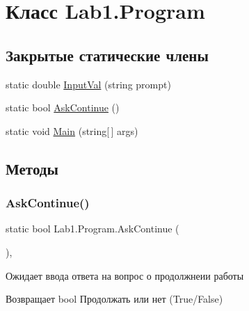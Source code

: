 \hypertarget{class_lab1_1_1_program}{}\section{Класс Lab1.\+Program}
\label{class_lab1_1_1_program}
\subsection*{Закрытые статические члены}
\begin{DoxyCompactItemize}
\item 
static double \hyperlink{class_lab1_1_1_program_a569623f6b568a6770c7d2a6b8726a7f7}{Input\+Val} (string prompt)
\item 
static bool \hyperlink{class_lab1_1_1_program_ab7d87ed9c7f3b503a0bf3a3654c706c6}{Ask\+Continue} ()
\item 
static void \hyperlink{class_lab1_1_1_program_ad4e0610aa096a9b9ab69f7fc7425799f}{Main} (string\mbox{[}$\,$\mbox{]} args)
\end{DoxyCompactItemize}


\subsection{Методы}
\mbox{\label{class_lab1_1_1_program_ab7d87ed9c7f3b503a0bf3a3654c706c6}} 
\subsubsection{\texorpdfstring{Ask\+Continue()}{AskContinue()}}
{\footnotesize\ttfamily static bool Lab1.\+Program.\+Ask\+Continue (\begin{DoxyParamCaption}{ }\end{DoxyParamCaption})\hspace{0.3cm}{\ttfamily [static]}, {\ttfamily [private]}}

Ожидает ввода ответа на вопрос о продолжнеии работы \begin{DoxyReturn}{Возвращает}
bool Продолжать или нет (True/\+False) 
\end{DoxyReturn}
\mbox{\label{class_lab1_1_1_program_a569623f6b568a6770c7d2a6b8726a7f7}} 
